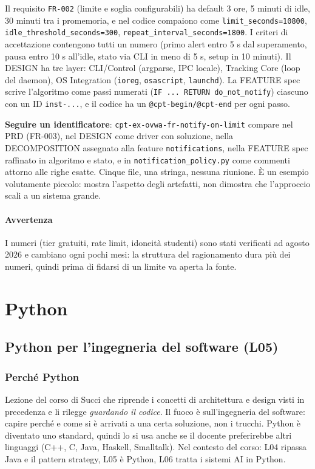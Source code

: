 \documentclass[a4paper,12pt]{article}
\begin{document}
Il requisito \texttt{FR-002} (limite e soglia configurabili) ha default 3 ore, 5 minuti di
idle, 30 minuti tra i promemoria, e nel codice compaiono come
\texttt{limit\_seconds=10800}, \texttt{idle\_threshold\_seconds=300},
\texttt{repeat\_interval\_seconds=1800}. I criteri di accettazione contengono tutti un
numero (primo alert entro 5 s dal superamento, pausa entro 10 s all'idle, stato via CLI in
meno di 5 s, setup in 10 minuti). Il DESIGN ha tre layer: CLI/Control (argparse, IPC
locale), Tracking Core (loop del daemon), OS Integration (\texttt{ioreg}, \texttt{osascript},
\texttt{launchd}). La FEATURE spec scrive l'algoritmo come passi numerati
(\texttt{IF ... RETURN do\_not\_notify}) ciascuno con un ID \texttt{inst-...}, e il codice
ha un \texttt{@cpt-begin/@cpt-end} per ogni passo.

\textbf{Seguire un identificatore}: \texttt{cpt-ex-ovwa-fr-notify-on-limit} compare nel PRD
(FR-003), nel DESIGN come driver con soluzione, nella DECOMPOSITION assegnato alla feature
\texttt{notifications}, nella FEATURE spec raffinato in algoritmo e stato, e in
\texttt{notification\_policy.py} come commenti attorno alle righe esatte. Cinque file, una
stringa, nessuna riunione. È un esempio volutamente piccolo: mostra l'aspetto degli
artefatti, non dimostra che l'approccio scali a un sistema grande.

\paragraph{Avvertenza} I numeri (tier gratuiti, rate limit, idoneità studenti) sono stati
verificati ad agosto 2026 e cambiano ogni pochi mesi: la struttura del ragionamento dura
più dei numeri, quindi prima di fidarsi di un limite va aperta la fonte.

\section{Python}
\subsection{Python per l'ingegneria del software (L05)}

\subsubsection{Perché Python}
Lezione del corso di Succi che riprende i concetti di architettura e design visti in
precedenza e li rilegge \emph{guardando il codice}. Il fuoco è sull'ingegneria del software:
capire perché e come si è arrivati a una certa soluzione, non i trucchi. Python è diventato
uno standard, quindi lo si usa anche se il docente preferirebbe altri linguaggi (C++, C,
Java, Haskell, Smalltalk). Nel contesto del corso: L04 ripassa Java e il pattern strategy,
L05 è Python, L06 tratta i sistemi AI in Python.
\end{document}
